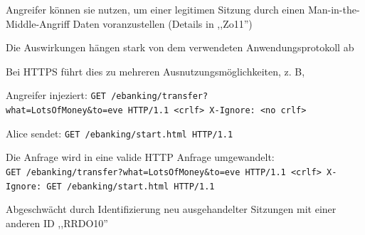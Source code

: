 \documentclass[a4paper]{article}
\begin{document}
\begin{multicols}{3}
\begin{itemize*}
\begin{itemize*}
                  \begin{itemize*}
                        \item Angreifer können sie nutzen, um einer legitimen Sitzung durch einen Man-in-the-Middle-Angriff Daten voranzustellen (Details in ,,Zo11'')
                        \item Die Auswirkungen hängen stark von dem verwendeten Anwendungsprotokoll ab
                  \end{itemize*}
                  \item Bei HTTPS führt dies zu mehreren Ausnutzungsmöglichkeiten, z. B,
                  \begin{itemize*}
                        \item Angreifer injeziert: \texttt{GET\ /ebanking/transfer?what=LotsOfMoney\&to=eve\ HTTP/1.1\ <crlf>{}\ X-Ignore:\ <no\ crlf>{}}
                        \item Alice sendet: \texttt{GET\ /ebanking/start.html\ HTTP/1.1}
                        \item Die Anfrage wird in eine valide HTTP Anfrage umgewandelt: \texttt{GET\ /ebanking/transfer?what=LotsOfMoney\&to=eve\ HTTP/1.1\ <crlf>{}\ X-Ignore:\ GET\ /ebanking/start.html\ HTTP/1.1}
                  \end{itemize*}
                  \item Abgeschwächt durch Identifizierung neu ausgehandelter Sitzungen mit einer anderen ID ,,RRDO10''
            \end{itemize*}
      \end{itemize*}


\end{multicols}
\end{document}
